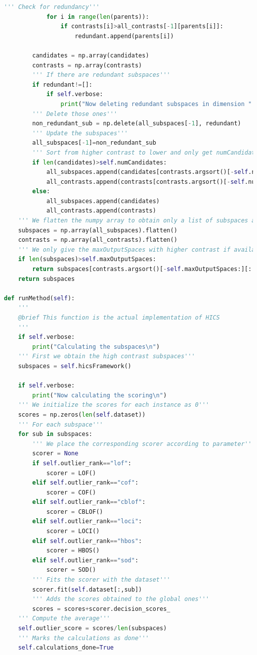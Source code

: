 \begin{lstlisting}[language=Python]
			''' Check for redundancy'''
			for i in range(len(parents)):
				if contrasts[i]>all_contrasts[-1][parents[i]]:
					redundant.append(parents[i])
		
		candidates = np.array(candidates)
		contrasts = np.array(contrasts)
		''' If there are redundant subspaces'''
		if redundant!=[]:
			if self.verbose:
				print("Now deleting redundant subspaces in dimension " + str(dimension) + ", " + str(len(redundant)) + " subspaces removed.")
		''' Delete those ones'''
		non_redundant_sub = np.delete(all_subspaces[-1], redundant)
		''' Update the subspaces'''
		all_subspaces[-1]=non_redundant_sub
		''' Sort from higher contrast to lower and only get numCandidates number of subspaces if available'''
		if len(candidates)>self.numCandidates:
			all_subspaces.append(candidates[contrasts.argsort()[-self.numCandidates:][::-1]])
			all_contrasts.append(contrasts[contrasts.argsort()[-self.numCandidates:][::-1]])
		else:
			all_subspaces.append(candidates)
			all_contrasts.append(contrasts)
	''' We flatten the numpy array to obtain only a list of subspaces and contrasts'''
	subspaces = np.array(all_subspaces).flatten()
	contrasts = np.array(all_contrasts).flatten()
	''' We only give the maxOutputSpaces with higher contrast if available'''
	if len(subspaces)>self.maxOutputSpaces:
		return subspaces[contrasts.argsort()[-self.maxOutputSpaces:][::-1]]
	return subspaces

def runMethod(self):
	'''
	@brief This function is the actual implementation of HICS
	'''
	if self.verbose:
		print("Calculating the subspaces\n")
	''' First we obtain the high contrast subspaces'''
	subspaces = self.hicsFramework()
	
	if self.verbose:
		print("Now calculating the scoring\n")
	''' We initialize the scores for each instance as 0'''
	scores = np.zeros(len(self.dataset))
	''' For each subspace'''
	for sub in subspaces:
		''' We place the corresponding scorer according to parameter'''
		scorer = None
		if self.outlier_rank=="lof":
			scorer = LOF()
		elif self.outlier_rank=="cof":
			scorer = COF()
		elif self.outlier_rank=="cblof":
			scorer = CBLOF()
		elif self.outlier_rank=="loci":
			scorer = LOCI()
		elif self.outlier_rank=="hbos":
			scorer = HBOS()
		elif self.outlier_rank=="sod":
			scorer = SOD()
		''' Fits the scorer with the dataset'''
		scorer.fit(self.dataset[:,sub])
		''' Adds the scores obtained to the global ones'''
		scores = scores+scorer.decision_scores_
	''' Compute the average'''
	self.outlier_score = scores/len(subspaces)
	''' Marks the calculations as done'''
	self.calculations_done=True
\end{lstlisting}